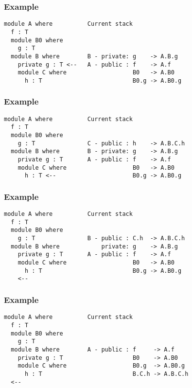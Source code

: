 \documentclass{beamer}
\newenvironment{agda}{
\begin{block}{}\small
}{
\end{block}
}
\begin{document}
\begin{frame}[fragile]
  \frametitle{Example}
\begin{agda}
\begin{verbatim}
module A where          Current stack
  f : T
  module B0 where
    g : T
  module B where        B - private: g    -> A.B.g
    private g : T <--   A - public : f    -> A.f
    module C where                   B0   -> A.B0
      h : T                          B0.g -> A.B0.g

\end{verbatim}
\end{agda}
\end{frame}

\begin{frame}[fragile]
  \frametitle{Example}
\begin{agda}
\begin{verbatim}
module A where          Current stack
  f : T
  module B0 where
    g : T               C - public : h    -> A.B.C.h
  module B where        B - private: g    -> A.B.g
    private g : T       A - public : f    -> A.f
    module C where                   B0   -> A.B0
      h : T <--                      B0.g -> A.B0.g

\end{verbatim}
\end{agda}
\end{frame}

\begin{frame}[fragile]
  \frametitle{Example}
\begin{agda}
\begin{verbatim}
module A where          Current stack
  f : T
  module B0 where
    g : T               B - public : C.h  -> A.B.C.h
  module B where            private: g    -> A.B.g
    private g : T       A - public : f    -> A.f
    module C where                   B0   -> A.B0
      h : T                          B0.g -> A.B0.g
    <--
\end{verbatim}
\end{agda}
\end{frame}

\begin{frame}[fragile]
  \frametitle{Example}
\begin{agda}
\begin{verbatim}
module A where          Current stack
  f : T
  module B0 where
    g : T
  module B where        A - public : f     -> A.f  
    private g : T                    B0    -> A.B0
    module C where                   B0.g  -> A.B0.g
      h : T                          B.C.h -> A.B.C.h
  <--
\end{verbatim}
\end{agda}
\end{frame}
\end{document}
